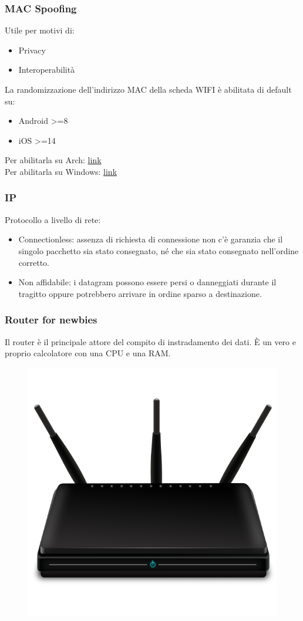 \documentclass[aspectratio=169]{beamer}
\begin{document}
    \begin{frame}
        \frametitle{MAC Spoofing}
        Utile per motivi di:
        \begin{itemize}
            \item Privacy
            \item Interoperabilità
        \end{itemize}
        La randomizzazione dell'indirizzo MAC della scheda WIFI è abilitata di default su:
        \begin{itemize}
            \item Android >=8
            \item iOS >=14
        \end{itemize}
        Per abilitarla su Arch: \href{https://wiki.archlinux.org/title/MAC_address_spoofing}{link}\\
        Per abilitarla su Windows: \href{https://support.microsoft.com/en-us/windows/how-to-use-random-hardware-addresses-in-windows-ac58de34-35fc-31ff-c650-823fc48eb1bc}{link}
    \end{frame}
    
    \begin{frame}
        \frametitle{IP}
        Protocollo a livello di rete: 
        \begin{itemize}
            \item Connectionless: assenza di richiesta di connessione \MVRightarrow{} non c'è garanzia che il singolo pacchetto sia stato consegnato, né che sia stato consegnato nell'ordine corretto.
            \item Non affidabile: i datagram possono essere persi o danneggiati durante il tragitto oppure potrebbero arrivare in ordine sparso a destinazione.
        \end{itemize}
    \end{frame}
    
    \begin{frame}
        \frametitle{Router for newbies}
        Il router è il principale attore del compito di instradamento dei dati.
        È un vero e proprio calcolatore con una CPU e una RAM.
        \begin{figure}
            \centering
            \includegraphics[width=0.30\linewidth]{img/wireless-router.png}
            \label{fig:router}
        \end{figure}
    \end{frame}
    
\end{document}
